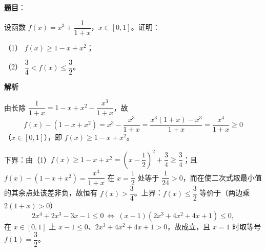 \begin{answer}

\textbf{题目}：

设函数 \(f(x)=x^{3}+\dfrac{1}{1+x}\)，\(x\in[0,1]\)。证明：

（1） \(f(x)\geqslant1-x+x^{2}\)；

（2） \(\dfrac{3}{4}<f(x)\leqslant\dfrac{3}{2}\)。

\textbf{解析}


由长除 \(\dfrac{1}{1+x}=1-x+x^{2}-\dfrac{x^{3}}{1+x}\)，故
\nopagebreak[4]
\[
f(x)-(1-x+x^{2})=x^{3}-\frac{x^{3}}{1+x}=\frac{x^{3}(1+x)-x^{3}}{1+x}=\frac{x^{4}}{1+x}\geqslant0
\]
（\(x\in[0,1]\)），即 \(f(x)\geqslant1-x+x^{2}\)。


下界：由（1）\(f(x)\geqslant1-x+x^{2}=\left(x-\dfrac{1}{2}\right)^{2}+\dfrac{3}{4}\geqslant\dfrac{3}{4}\)；且 \(f(x)-(1-x+x^{2})=\dfrac{x^{4}}{1+x}\) 在 \(x=\dfrac{1}{2}\) 处等于 \(\dfrac{1}{24}>0\)，而在使二次式取最小值的其余点处该差非负，故恒有 \(f(x)>\dfrac{3}{4}\)。上界：\(f(x)\leqslant\dfrac{3}{2}\) 等价于（两边乘 \(2(1+x)>0\)）
\nopagebreak[4]
\[
2x^{4}+2x^{3}-3x-1\leqslant0
\ \Longleftrightarrow\
(x-1)(2x^{3}+4x^{2}+4x+1)\leqslant0,
\]
在 \(x\in[0,1]\) 上 \(x-1\leqslant0\)、\(2x^{3}+4x^{2}+4x+1>0\)，故成立，且 \(x=1\) 时取等号 \(f(1)=\dfrac{3}{2}\)。



\end{answer}